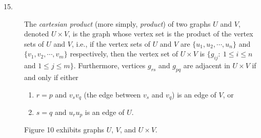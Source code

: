 \documentclass{article}
\begin{document}
\begin{description}

\item[15.] The \emph{cartesian product} (more simply, \emph{product}) of two graphs $U$ and $V$, denoted $U \times V$, is the graph whose vertex set is the product of the vertex sets of $U$ and $V$, i.e., if the vertex sets of $U$ and $V$ are $\{ u_1,u_2,\cdots,u_n \}$ and $\{ v_1,v_2,\cdots,v_m \}$ respectively, then the vertex set of $U \times V$ is $\{ g_{ij}:\ 1 \leq i \leq n$ and $1 \leq j \leq m \}$. Furthermore, vertices $g_{rs}$ and $g_{pq}$ are adjacent in $U \times V$ if and only if either
  \begin{enumerate}[\hspace{1cm}(1)]
    \item $r = p$ and $v_s v_q$ (the edge between $v_s$ and $v_q$) is an edge of $V$, or
    \item $s = q$ and $u_r u_p$ is an edge of $U$.
  \end{enumerate}
  Figure 10 exhibits graphs $U$, $V$, and $U \times V$.


\end{description}
\end{document}
